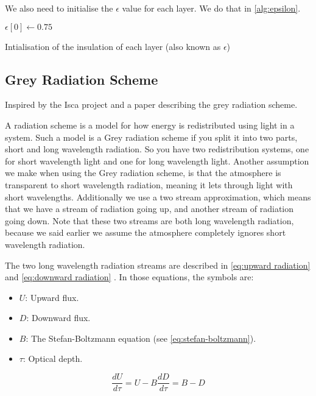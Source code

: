 We also need to initialise the $\epsilon$ value for each layer. We do that in \autoref{alg:epsilon}.

\begin{algorithm}
    $\epsilon[0] \leftarrow 0.75$ \;
    \caption{Intialisation of the insulation of each layer (also known as $\epsilon$)}
    \label{alg:epsilon}
\end{algorithm}

\subsection{Grey Radiation Scheme}
Inspired by the Isca project \cite{isca} and a paper describing the grey radiation scheme\cite{greyRad}.

A radiation scheme is a model for how energy is redistributed using light in a system. Such a model is a Grey radiation scheme if you split it into two parts, short and long wavelength radiation.
So you have two redistribution systems, one for short wavelength light and one for long wavelength light. Another assumption we make when using the Grey radiation scheme, is that the atmosphere 
is transparent to short wavelength radiation, meaning it lets through light with short wavelengths. Additionally we use a two stream approximation, which means that we have a stream of radiation
going up, and another stream of radiation going down. Note that these two streams are both long wavelength radiation, because we said earlier we assume the atmosphere completely ignores short 
wavelength radiation.

The two long wavelength radiation streams are described in \autoref{eq:upward radiation} and \autoref{eq:downward radiation} \cite{greyRad}. In those equations, the symbols are:

\begin{itemize}
    \item $U$: Upward flux.
    \item $D$: Downward flux.
    \item $B$: The Stefan-Boltzmann equation (see \autoref{eq:stefan-boltzmann}).
    \item $\tau$: Optical depth.
\end{itemize}

\begin{subequations}
    \begin{equation}
        \frac{dU}{d\tau} = U - B
        \label{eq:upward radiation}
    \end{equation}
    \begin{equation}
        \frac{dD}{d\tau} = B - D
        \label{eq:downward radiation}
    \end{equation}
\end{subequations}

